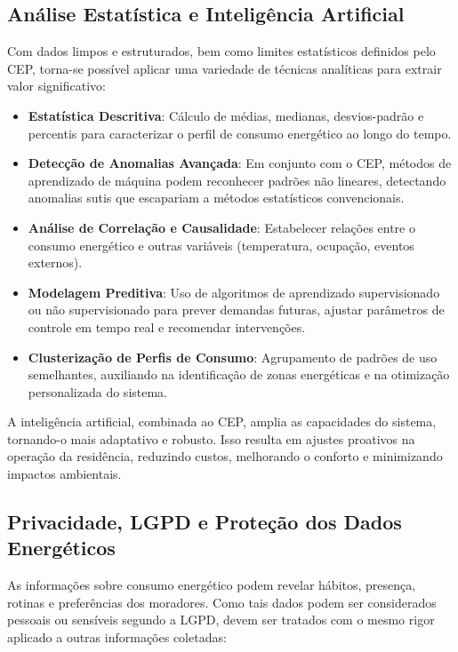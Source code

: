 \subsection{Análise Estatística e Inteligência Artificial}
Com dados limpos e estruturados, bem como limites estatísticos definidos pelo CEP, torna-se possível aplicar uma variedade de técnicas analíticas para extrair valor significativo:

\begin{itemize}
    \item \textbf{Estatística Descritiva}: Cálculo de médias, medianas, desvios-padrão e percentis para caracterizar o perfil de consumo energético ao longo do tempo.
    \item \textbf{Detecção de Anomalias Avançada}: Em conjunto com o CEP, métodos de aprendizado de máquina podem reconhecer padrões não lineares, detectando anomalias sutis que escapariam a métodos estatísticos convencionais.
    \item \textbf{Análise de Correlação e Causalidade}: Estabelecer relações entre o consumo energético e outras variáveis (temperatura, ocupação, eventos externos).
    \item \textbf{Modelagem Preditiva}: Uso de algoritmos de aprendizado supervisionado ou não supervisionado para prever demandas futuras, ajustar parâmetros de controle em tempo real e recomendar intervenções.
    \item \textbf{Clusterização de Perfis de Consumo}: Agrupamento de padrões de uso semelhantes, auxiliando na identificação de zonas energéticas e na otimização personalizada do sistema.
\end{itemize}

A inteligência artificial, combinada ao CEP, amplia as capacidades do sistema, tornando-o mais adaptativo e robusto. Isso resulta em ajustes proativos na operação da residência, reduzindo custos, melhorando o conforto e minimizando impactos ambientais.

\subsection{Privacidade, LGPD e Proteção dos Dados Energéticos}

As informações sobre consumo energético podem revelar hábitos, presença, rotinas e preferências dos moradores. Como tais dados podem ser considerados pessoais ou sensíveis segundo a LGPD, devem ser tratados com o mesmo rigor aplicado a outras informações coletadas:

